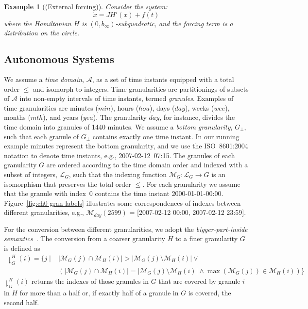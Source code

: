 \documentclass[abstracton,12pt]{scrreprt}
\newtheorem{example}{Example}
\begin{document}
\begin{example} [{\rm(External forcing)}]
Consider the system:
\begin{equation}
  \dot{x} = JH' (x) + f(t)
\end{equation}
where the Hamiltonian $H$ is $\left(0,b_{\infty}\right)$-subquadratic,
and the forcing term is a distribution on the circle.
\end{example}

\subsection{Autonomous Systems}

We assume a \emph{time domain}, $\mathcal{A}$, as a set of time
instants equipped with a total order $\leq$ and isomorph to integers.
Time granularities are partitionings of subsets of $\mathcal{A}$ into
non-empty intervals of time instants, termed \emph{granules}.
Examples of time granularities are minutes ($\mathit{min}$), hours
($\mathit{hou}$), days ($\mathit{day}$), weeks ($\mathit{wee}$),
months ($\mathit{mth}$), and years ($\mathit{yea}$).  The granularity
$\mathit{day}$, for instance, divides the time domain into granules of
1440 minutes.  We assume a \emph{bottom granularity}, $G_\bot$, such
that each granule of $G_\bot$ contains exactly one time instant.  In
our running example minutes represent the bottom granularity, and we
use the ISO~8601:2004 notation to denote time instants, e.g.,
\mbox{2007-02-12 07:15}.  The granules of each granularity $G$ are
ordered according to the time domain order and indexed with a subset
of integers, $\mathcal{L}_G$, such that the indexing function
$\mathcal{M}_G : \mathcal{L}_G \to G$ is an isomorphism that preserves
the total order $\leq$. For each granularity we assume that the
granule with index~0 contains the time instant 2000-01-01-00:00.
Figure~\ref{fig:ch0-gran-labels} illustrates some correspondences of
indexes between different granularities, e.g.,
$\mathcal{M}_\mathit{day}(2599)$ = [2007-02-12 00:00, 2007-02-12
23:59].

For the conversion between different granularities, we adopt the
\emph{bigger-part-inside semantics}~\cite{Ohlbach06,ical98}.  The
conversion from a coarser granularity $H$ to a finer granularity $G$
is defined as
\begin{align*}
  \downharpoonright^{H}_{G}(i) = \{ j \mid
  & |\mathcal{M}_{G}(j) \cap
  \mathcal{M}_{H}(i)| > |\mathcal{M}_{G}(j) \setminus
  \mathcal{M}_{H}(i)| \lor {}
  \\
  & (|\mathcal{M}_{G}(j) \cap \mathcal{M}_{H}(i)| =
  |\mathcal{M}_{G}(j) \setminus \mathcal{M}_{H}(i)| \land
  \max(\mathcal{M}_{G}(j)) \in \mathcal{M}_{H}(i) )\}
\end{align*}
$\downharpoonright^{H}_{G}(i)$ returns the indexes of those granules
in $G$ that are covered by granule $i$ in $H$ for more than a half or,
if exactly half of a granule in $G$ is covered, the second half.
\end{document}
